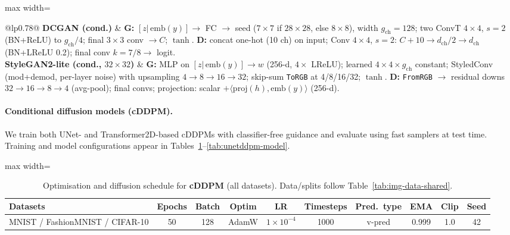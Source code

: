 \begin{table}[H]
\centering
\footnotesize
\caption{\textbf{DCGAN} and \textbf{StyleGAN2-lite} architectures. 
$C{=}1$ (MNIST/Fashion-MNIST), $C{=}3$ (CIFAR-10).}
\label{tab:gans-arch}
\begin{adjustbox}{max width=\textwidth}
\begin{tabularx}{\textwidth}{@{}lp{0.78\textwidth}@{}}
\toprule
\textbf{DCGAN (cond.)} &
\textbf{G:} $[z|\,\mathrm{emb}(y)] \to$ FC $\to$ seed ($7\times 7$ if $28\times 28$, else $8\times 8$), width $g_\mathrm{ch}{=}128$; two ConvT $4\times 4$, $s{=}2$ (BN+ReLU) to $g_\mathrm{ch}/4$; final $3\times 3$ conv $\to C$; $\tanh$. 
\newline
\textbf{D:} concat one-hot (10 ch) on input; Conv $4\times 4$, $s{=}2$: $C{+}10 \to d_\mathrm{ch}/2 \to d_\mathrm{ch}$ (BN+LReLU 0.2); final conv $k{=}7/8 \to$ logit.\\
\midrule
\textbf{StyleGAN2-lite (cond., $32\times 32$)} &
\textbf{G:} MLP on $[z|\,\mathrm{emb}(y)] \to w$ (256-d, $4\times$ LReLU); learned $4\times 4\times g_\mathrm{ch}$ constant; StyledConv (mod+demod, per-layer noise) with upsampling $4\to 8\to 16\to 32$; skip-sum \texttt{ToRGB} at 4/8/16/32; $\tanh$. 
\newline
\textbf{D:} \texttt{FromRGB} $\to$ residual downs $32\to 16\to 8\to 4$ (avg-pool); final convs; projection: scalar $+ \langle \mathrm{proj}(h), \mathrm{emb}(y)\rangle$ (256-d).\\
\bottomrule
\end{tabularx}
\end{adjustbox}
\end{table}

\paragraph{Conditional diffusion models (cDDPM).}
We train both UNet- and Transformer2D-based cDDPMs with classifier-free guidance and evaluate using
fast samplers at test time. Training and model configurations appear in
Tables~\ref{tab:cddpm-train}--\ref{tab:unetddpm-model}.

\begin{table}[H]
\centering
\scriptsize
\caption{Optimisation and diffusion schedule for \textbf{cDDPM} (all datasets). Data/splits follow Table~\ref{tab:img-data-shared}.}
\label{tab:cddpm-train}
\begin{adjustbox}{max width=\linewidth}
\begin{tabular}{@{}lccccccccc@{}}
\toprule
Datasets & Epochs & Batch & Optim & LR & Timesteps & Pred.\ type & EMA & Clip & Seed \\
\midrule
MNIST / FashionMNIST / CIFAR-10 & 50 & 128 & AdamW & $1{\times}10^{-4}$ & 1000 & v-pred & 0.999 & 1.0 & 42 \\
\bottomrule
\end{tabular}
\end{adjustbox}
\end{table}

